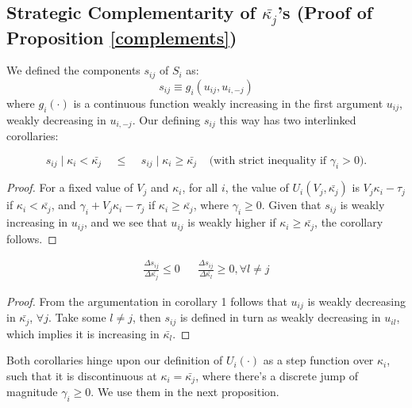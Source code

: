 \documentclass[../main.tex]{subfiles}
\begin{document}
\subsection{Strategic Complementarity of $\bar{\kappa_j}$'s (Proof of Proposition \ref{complements})}
\label{sec:strategic}

We defined the components $s_{ij}$ of $S_i$  as:
\[s_{ij} \equiv g_i(u_{ij}, u_{i,-j})\]
where $g_i(\cdot)$ is a continuous function weakly increasing in the first argument $u_{ij}$, weakly decreasing in $u_{i,-j}$. Our defining $s_{ij}$ this way has two interlinked corollaries:

\begin{corollary}
\[s_{ij} \mid \kappa_i < \bar{\kappa_j} \;\;\;\; \leq     \;\;\;\; s_{ij} \mid \kappa_i \geq \bar{\kappa_j} \;\;\;\; \text{(with strict inequality if $\gamma_i > 0$).}\]
\end{corollary}

\begin{proof}
    For a fixed value of $V_j$ and $\kappa_i$, for all $i$, the value of $U_i(V_j, \bar{\kappa_j})$ is $V_j \kappa_i - \tau_j$ if $\kappa_i < \bar{\kappa_j}$, and $\gamma_i + V_j \kappa_i - \tau_j$ if $\kappa_i \geq \bar{\kappa_j}$, where $\gamma_i \geq 0$. Given that $s_{ij}$ is weakly increasing in $u_{ij}$, and we see that $u_{ij}$ is weakly higher if $\kappa_i \geq \bar{\kappa_j}$, the corollary follows.
\end{proof}


\begin{corollary}
\begin{align*}
    \frac{\Delta s_{ij}}{\Delta\bar{\kappa_{j}}} \leq 0 &&  \frac{\Delta s_{ij}}{\Delta\bar{\kappa_{l}}} \geq 0, \forall l \neq j
\end{align*}   
\end{corollary}

\begin{proof}
From the argumentation in corollary 1 follows that $u_{ij}$ is weakly decreasing in $\bar{\kappa_j}$, $\forall j$. Take some $l \neq j$, then $s_{ij}$ is defined in turn as weakly decreasing in $u_{il}$, which implies it is increasing in $\bar{\kappa_l}$.
\end{proof}

Both corollaries hinge upon our definition of $U_i(\cdot)$ as a step function over $\kappa_i$, such that it is discontinuous at $\kappa_i = \bar{\kappa_j}$, where there's a discrete jump of magnitude  $\gamma_i \geq 0$. We use them in the next proposition.
\end{document}
